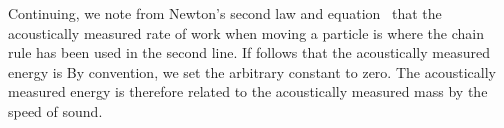 Continuing,
we note from Newton's second law and equation~ that the acoustically measured rate of work
when moving a particle is
where the chain rule has been used in the second line.
If follows that the acoustically measured energy is
By convention, we set the arbitrary constant to zero.
The acoustically measured energy is therefore related to the acoustically measured mass by the speed of sound.














